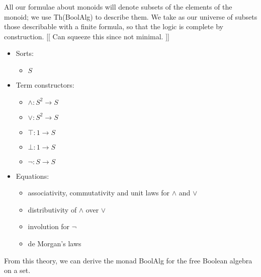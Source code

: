 \documentclass{article}
\newcommand{\maps}{\colon}
\begin{document}
All our formulae about monoids will denote subsets of the elements of the monoid; we use Th(BoolAlg) to describe them.  We take as our universe of subsets those describable with a finite formula, so that the logic is complete by construction. [[ Can squeeze this since not minimal. ]]
\begin{center}
  \begin{itemize}
    \item Sorts:
    \begin{itemize}
      \item $S$
    \end{itemize}
    \item Term constructors:
    \begin{itemize}
      \item $\land\maps S^2 \to S$
      \item $\lor\maps S^2 \to S$
      \item $\top\maps 1 \to S$
      \item $\bot\maps 1 \to S$
      \item $\neg\maps S \to S$
    \end{itemize}
    \item Equations:
    \begin{itemize}
      \item associativity, commutativity and unit laws for $\land$ and $\lor$
      \item distributivity of $\land$ over $\lor$
      \item involution for $\neg$
      \item de Morgan's laws
    \end{itemize}
  \end{itemize}
\end{center}
From this theory, we can derive the monad BoolAlg for the free Boolean algebra on a set.
\end{document}
